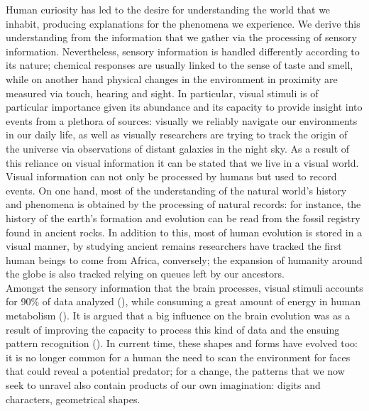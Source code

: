 Human curiosity has led to the desire for understanding the world that we inhabit, producing 
explanations for the phenomena we experience. We derive this understanding from the information 
that we gather via the processing of sensory information. Nevertheless, sensory information is 
handled differently according to its nature; chemical responses are usually linked to the 
sense of taste and smell, while on another hand physical changes in the environment in proximity 
are measured via touch, hearing and sight. In particular, visual stimuli is of particular 
importance given its abundance and its capacity to provide insight into events from a plethora 
of sources: visually we reliably navigate our environments in our daily life, as well as 
visually researchers are trying to track the origin of the universe via observations of distant 
galaxies in the night sky. As a result of this reliance on visual information it can be stated 
that we live in a visual world.\\

\noindent Visual information can not only be processed by humans but used to record events. On 
one hand, most of the understanding of the natural world's history and phenomena is obtained 
by the processing of natural records: for instance, the history of the earth's formation and 
evolution can be read from the fossil registry found in ancient rocks. In addition to this, 
most of human evolution is stored in a visual manner, by studying ancient remains researchers 
have tracked the first human beings to come from Africa, conversely; the expansion of humanity 
around the globe is also tracked relying on queues left by our ancestors.\\
Amongst the sensory information that the brain processes, visual stimuli accounts 
for 90\% of data analyzed (\cite{potter2014detecting}), while consuming a great amount of energy 
in human metabolism (\cite{phelps1981metabolic}). It is argued that a big influence on the 
brain evolution was as a result of improving the capacity to process this kind of data and the 
ensuing  pattern recognition (\cite{mattson2014superior}). 
In current time, these shapes and forms have evolved too: it is no longer common for a human
the need to scan the environment for faces that could reveal a potential predator; for a change, 
the patterns that we now seek to unravel also contain products of our own imagination: digits and 
characters, geometrical shapes.\\

